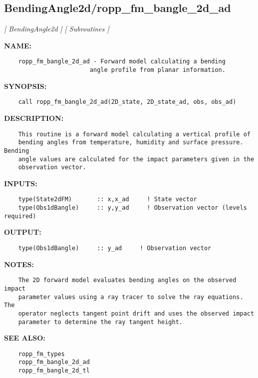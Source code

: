 \subsection{BendingAngle2d/ropp\_fm\_bangle\_2d\_ad}
\textsl{[ BendingAngle2d ]}
\textsl{[ Subroutines ]}

\label{ch:robo11}
\label{ch:BendingAngle2d_ropp_fm_bangle_2d_ad}
\textbf{NAME:}\hspace{0.08in}\begin{Verbatim}
    ropp_fm_bangle_2d_ad - Forward model calculating a bending
                        angle profile from planar information.
\end{Verbatim}
\textbf{SYNOPSIS:}\hspace{0.08in}\begin{Verbatim}
    call ropp_fm_bangle_2d_ad(2D_state, 2D_state_ad, obs, obs_ad)
\end{Verbatim}
\textbf{DESCRIPTION:}\hspace{0.08in}\begin{Verbatim}
    This routine is a forward model calculating a vertical profile of
    bending angles from temperature, humidity and surface pressure. Bending
    angle values are calculated for the impact parameters given in the
    observation vector.
\end{Verbatim}
\textbf{INPUTS:}\hspace{0.08in}\begin{Verbatim}
    type(State2dFM)       :: x,x_ad     ! State vector
    type(Obs1dBangle)     :: y,y_ad     ! Observation vector (levels required)
\end{Verbatim}
\textbf{OUTPUT:}\hspace{0.08in}\begin{Verbatim}
    type(Obs1dBangle)     :: y_ad     ! Observation vector
\end{Verbatim}
\textbf{NOTES:}\hspace{0.08in}\begin{Verbatim}
    The 2D forward model evaluates bending angles on the observed impact
    parameter values using a ray tracer to solve the ray equations. The
    operator neglects tangent point drift and uses the observed impact
    parameter to determine the ray tangent height.
\end{Verbatim}
\textbf{SEE ALSO:}\hspace{0.08in}\begin{Verbatim}
    ropp_fm_types
    ropp_fm_bangle_2d_ad
    ropp_fm_bangle_2d_tl
\end{Verbatim}
